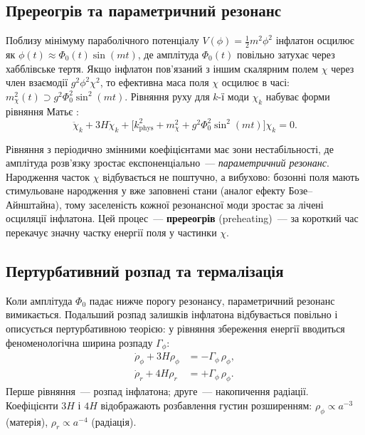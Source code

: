 \documentclass[12pt, a4paper]{article}
\begin{document}
\subsection{Пререогрів та параметричний резонанс}

Поблизу мінімуму параболічного потенціалу
$V(\phi) = \frac{1}{2}m^2\phi^2$ інфлатон осцилює як
$\phi(t) \approx \Phi_0(t)\sin(mt)$, де амплітуда
$\Phi_0(t)$ повільно затухає через хабблівське тертя.
Якщо інфлатон пов'язаний з іншим скалярним полем $\chi$
через член взаємодії $g^2\phi^2\chi^2$, то ефективна маса
поля $\chi$ осцилює в часі: $m_\chi^2(t) \supset
g^2\Phi_0^2\sin^2(mt)$. Рівняння руху для $k$-ї моди
$\chi_k$ набуває форми рівняння Матьє
\cite{kofman_1994, kofman_1997}:
\begin{equation}\label{eq:mathieu}
  \ddot{\chi}_k + 3H\dot{\chi}_k
  + \bigl[k_\mathrm{phys}^2 + m_\chi^2
         + g^2\Phi_0^2\sin^2(mt)\bigr]\chi_k = 0.
\end{equation}

Рівняння з періодично змінними коефіцієнтами має зони
нестабільності, де амплітуда розв'язку зростає
експоненціально~--- \emph{параметричний резонанс}.
Народження часток $\chi$ відбувається не поштучно, а
вибухово: бозонні поля мають стимульоване народження у
вже заповнені стани (аналог ефекту Бозе--Айнштайна), тому
заселеність кожної резонансної моди зростає за лічені
осциляції інфлатона. Цей процес~--- \textbf{пререогрів}
(preheating)~--- за короткий час перекачує значну частку
енергії поля у частинки $\chi$.

\subsection{Пертурбативний розпад та термалізація}

Коли амплітуда $\Phi_0$ падає нижче порогу резонансу,
параметричний резонанс вимикається. Подальший розпад
залишків інфлатона відбувається повільно і описується
пертурбативною теорією: у рівняння збереження енергії
вводиться феноменологічна ширина розпаду $\Gamma_\phi$:
\begin{align}
  \dot{\rho}_\phi + 3H\rho_\phi
    &= -\Gamma_\phi\,\rho_\phi,
    \label{eq:reheat_rho_phi} \\
  \dot{\rho}_r + 4H\rho_r
    &= +\Gamma_\phi\,\rho_\phi.
    \label{eq:reheat_rho_r}
\end{align}
Перше рівняння~--- розпад інфлатона; друге~--- накопичення
радіації. Коефіцієнти $3H$ і $4H$ відображають розбавлення
густин розширенням: $\rho_\phi \propto a^{-3}$ (матерія),
$\rho_r \propto a^{-4}$ (радіація).
\end{document}
